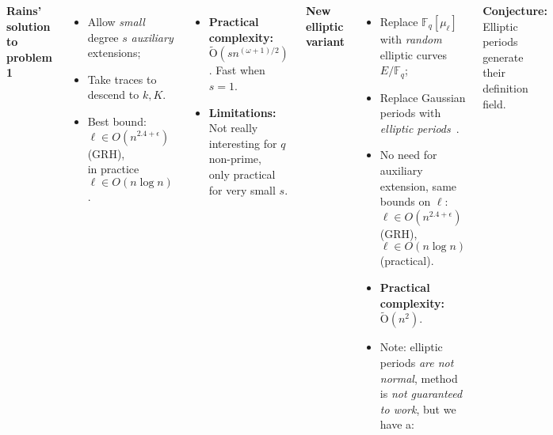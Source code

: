 \documentclass[20pt,a0paper,blockverticalspace=10mm]{tikzposter}
\def\F {\ensuremath{\mathbb{F}}}
\def\tildO {\ensuremath{\mathrm{\tilde{O}}}}
\renewcommand{\paragraph}[1]{\smallskip\textbf{#1}}
\begin{document}
\begin{columns}
{    \paragraph{Rains' solution to problem 1}
    \begin{itemize}
    \item Allow \emph{small} degree $s$ \emph{auxiliary}\\ extensions;
    \item Take traces to descend to $k, K$.
    \item Best bound: $\ell\in O(n^{2.4+\epsilon})$ (GRH),\\
      in practice $\ell\in O(n\log n)$.
    \end{itemize}
    
    \begin{itemize}
    \item \textbf{Practical complexity:}
      $\tildO\left(sn^{(\omega+1)/2}\right)$. Fast when $s=1$.
    \item \textbf{Limitations:}  Not really interesting for $q$ non-prime,\\
      only practical for very small $s$.
    \end{itemize}
    
    \paragraph{New elliptic variant}
    \begin{itemize}
    \item Replace $\F_q[\mu_\ell]$ with \emph{random} elliptic curves
      $E/\F_q$;
    \item Replace Gaussian periods with \emph{elliptic
        periods}~\cite{mihailescu+morain+schost07}.
    \item No need for auxiliary extension, same bounds on $\ell$:\\
      $\ell\in O(n^{2.4+\epsilon})$ (GRH),
      $\ell\in O(n\log n)$ (practical).
    \item \textbf{Practical complexity:} $\tildO\left(n^2\right)$.
    \item Note: elliptic periods \emph{are not normal}, method is
      \emph{not guaranteed to work}, but we have a:
    \end{itemize}

    \paragraph{Conjecture:} Elliptic periods generate their definition
    field.
  }


\end{columns}
\end{document}
